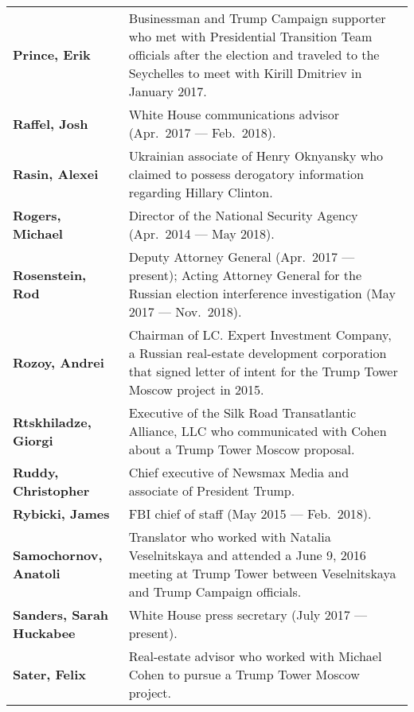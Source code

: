 \begin{longtable}{ p{} p{} }
    \textbf{Prince, Erik} & Businessman and Trump Campaign supporter who met with Presidential Transition Team officials after the election and traveled to the Seychelles to meet with Kirill Dmitriev in January 2017. \\

    \textbf{Raffel, Josh} & White House communications advisor (Apr.~2017 — Feb.~2018). \\

    \textbf{Rasin, Alexei} & Ukrainian associate of Henry Oknyansky who claimed to possess derogatory information regarding Hillary Clinton. \\

    \textbf{Rogers, Michael} & Director of the National Security Agency (Apr.~2014 — May 2018). \\

    \textbf{Rosenstein, Rod} & Deputy Attorney General (Apr.~2017 — present); Acting Attorney General for the Russian election interference investigation (May 2017 — Nov.~2018). \\

    \textbf{Rozoy, Andrei} & Chairman of LC. Expert Investment Company, a Russian real-estate development corporation that signed letter of intent for the Trump Tower Moscow project in 2015. \\

    \textbf{Rtskhiladze, Giorgi} & Executive of the Silk Road Transatlantic Alliance, LLC who communicated with Cohen about a Trump Tower Moscow proposal. \\

    \textbf{Ruddy, Christopher} & Chief executive of Newsmax Media and associate of President Trump. \\

    \textbf{Rybicki, James} & FBI chief of staff (May 2015 — Feb.~2018). \\

    \textbf{Samochornov, Anatoli} & Translator who worked with Natalia Veselnitskaya and attended a June 9, 2016 meeting at Trump Tower between Veselnitskaya and Trump Campaign officials. \\

    \textbf{Sanders, Sarah Huckabee} & White House press secretary (July 2017 — present). \\

    \textbf{Sater, Felix} & Real-estate advisor who worked with Michael Cohen to pursue a Trump Tower Moscow project. \\


\end{longtable}
